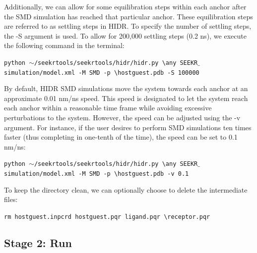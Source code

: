 \documentclass[9pt,training,pubversion]{livecoms}
\begin{document}
\noindent Additionally, we can allow for some equilibration steps within each anchor after the SMD simulation has reached that particular anchor. These equilibration steps are referred to as settling steps in HIDR. To specify the number of settling steps, the -S argument is used. To allow for 200,000 settling steps (0.2 ns), we execute the following command in the terminal:

\begin{tcolorbox}[colback=black!8!white, colframe=black!50!black, fontlower=\tiny, left=2pt, right=2pt, top=2pt, bottom=2pt] 
\texttt{python $\sim$/seekrtools/seekrtools/hidr/hidr.py \textbackslash \linebreak any SEEKR$\_$simulation/model.xml -M SMD -p \textbackslash \linebreak hostguest.pdb -S 100000}
\end{tcolorbox}

\noindent By default, HIDR SMD simulations move the system towards each anchor at an approximate 0.01 nm/ns speed. This speed is designated to let the system reach each anchor within a reasonable time frame while avoiding excessive perturbations to the system. However, the speed can be adjusted using the -v argument. For instance, if the user desires to perform SMD simulations ten times faster (thus completing in one-tenth of the time), the speed can be set to 0.1 nm/ns:

\begin{tcolorbox}[colback=black!8!white, colframe=black!50!black, fontlower=\tiny, left=2pt, right=2pt, top=2pt, bottom=2pt] 
\texttt{python $\sim$/seekrtools/seekrtools/hidr/hidr.py \textbackslash \linebreak any SEEKR$\_$simulation/model.xml -M SMD -p \textbackslash \linebreak hostguest.pdb -v 0.1}
\end{tcolorbox}

\noindent To keep the directory clean, we can optionally choose to delete the intermediate files:

\begin{tcolorbox}[colback=black!8!white, colframe=black!50!black, fontlower=\tiny, left=2pt, right=2pt, top=2pt, bottom=2pt] 
\texttt{rm hostguest.inpcrd hostguest.pqr ligand.pqr \textbackslash \linebreak receptor.pqr}
\end{tcolorbox}


\subsection*{Stage 2: Run}
\vspace{2mm}
\end{document}
